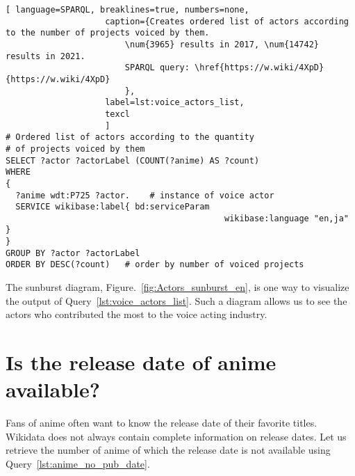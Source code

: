 \begin{lstlisting}[ language=SPARQL, breaklines=true, numbers=none,
                    caption={Creates ordered list of actors according to the number of projects voiced by them.
                        \num{3965} results in 2017, \num{14742} results in 2021.
                        SPARQL query: \href{https://w.wiki/4XpD}{https://w.wiki/4XpD}
                        },
                    label=lst:voice_actors_list,
                    texcl 
                    ]
# Ordered list of actors according to the quantity
# of projects voiced by them
SELECT ?actor ?actorLabel (COUNT(?anime) AS ?count)
WHERE
{
  ?anime wdt:P725 ?actor.	 # instance of voice actor
  SERVICE wikibase:label{ bd:serviceParam
			  								wikibase:language "en,ja" }
}
GROUP BY ?actor	?actorLabel
ORDER BY DESC(?count)	# order by number of voiced projects
\end{lstlisting}%

\begin{figure*}

    \setlength{\fboxsep}{0pt}%
    \setlength{\fboxrule}{1pt}%
	\caption[Sunburst diagram of number of roles voiced by different actors, 2021.]{Sunburst diagram of number of roles voiced by different actors, 2021. The diagram is constructed using the output of Query~\ref{lst:voice_actors_list} in \href{https:\\app.rawgraphs.io}{Rawgraphs}.}%
    \label{fig:Actors_sunburst_en}%
\end{figure*}

The sunburst diagram, Figure.~\ref{fig:Actors_sunburst_en}, is one way to visualize the output of Query~\ref{lst:voice_actors_list}. Such a diagram allows us to see the actors who contributed the most to the voice acting industry.

\section{Is the release date of anime available?}

Fans of anime often want to know the release date of their favorite titles. Wikidata does not always contain complete information on release dates. Let us retrieve the number of anime of which the release date is not available using Query~\ref{lst:anime_no_pub_date}.

